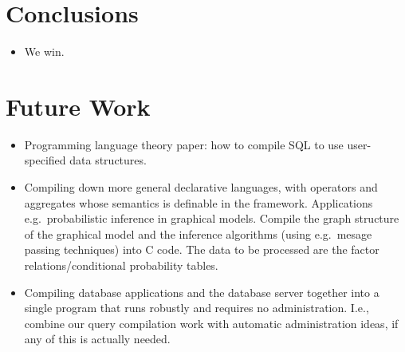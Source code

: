 \section{Conclusions}

\begin{itemize}
  \item We win.
\end{itemize}

\section{Future Work}


\begin{itemize}
\item
Programming language theory paper: how to compile SQL to use user-specified
data structures.

\item
Compiling down more general declarative languages, with operators and
aggregates whose semantics is definable in the framework. Applications e.g.\
probabilistic inference in graphical models. Compile the graph structure
of the graphical model and the inference algorithms (using e.g.\ mesage
passing techniques) into C code. The data to be processed are the factor
relations/conditional probability tables.

\item
Compiling database applications and the database server together into a single
program that runs robustly and requires no administration. I.e., combine
our query compilation work with automatic administration ideas, if any of
this is actually needed.
\end{itemize}
